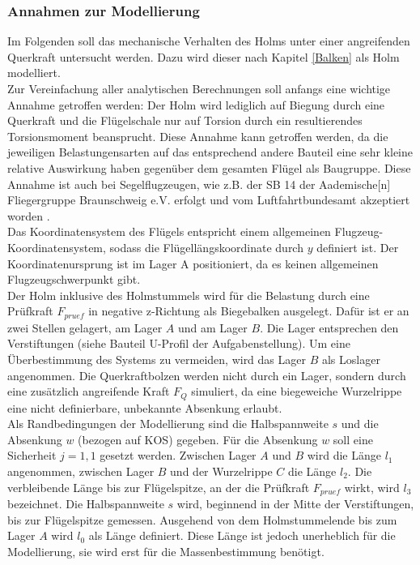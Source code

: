 \subsubsection{Annahmen zur Modellierung}
Im Folgenden soll das mechanische Verhalten des Holms unter einer angreifenden Querkraft untersucht werden. Dazu wird dieser nach Kapitel  \ref{Balken} als Holm modelliert.\\

\noindent Zur Vereinfachung aller analytischen Berechnungen soll anfangs eine wichtige Annahme getroffen werden: Der Holm wird lediglich auf Biegung durch eine Querkraft und die Flügelschale nur auf Torsion durch ein resultierendes Torsionsmoment beansprucht. Diese Annahme kann getroffen werden, da die jeweiligen Belastungensarten auf das entsprechend andere Bauteil eine sehr kleine relative Auswirkung haben gegenüber dem gesamten Flügel als Baugruppe. Diese Annahme ist auch bei Segelflugzeugen, wie z.B. der SB 14 der \glqq Aademische[n] Fliegergruppe Braunschweig e.V.\grqq\: erfolgt und vom Luftfahrtbundesamt akzeptiert worden \cite{item21}.\\

\noindent Das Koordinatensystem des Flügels entspricht einem allgemeinen Flugzeug-Koordinatensystem, sodass die Flügellängskoordinate durch $y$ definiert ist. Der Koordinatenursprung ist im Lager A positioniert, da es keinen allgemeinen Flugzeugschwerpunkt gibt. \\

\noindent Der Holm inklusive des Holmstummels wird für die Belastung durch eine Prüfkraft $F_{pruef}$ in negative z-Richtung als Biegebalken ausgelegt. Dafür ist er an zwei Stellen gelagert, am Lager $A$ und am Lager $B$. Die Lager entsprechen den Verstiftungen (siehe Bauteil U-Profil der Aufgabenstellung). Um eine Überbestimmung des Systems zu vermeiden, wird das Lager $B$ als Loslager angenommen. Die Querkraftbolzen werden nicht durch ein Lager, sondern durch eine zusätzlich angreifende Kraft $F_{Q}$ simuliert, da eine biegeweiche Wurzelrippe eine nicht definierbare, unbekannte Absenkung erlaubt.\\

\noindent Als Randbedingungen der Modellierung sind die Halbspannweite $s$ und die Absenkung $w$ (bezogen auf KOS) gegeben. Für die Absenkung $w$ soll eine Sicherheit $j=1,1$ gesetzt werden. Zwischen Lager $A$ und $B$ wird die Länge $l_{1}$ angenommen, zwischen Lager $B$ und der Wurzelrippe $C$ die Länge $l_{2}$. Die verbleibende Länge bis zur Flügelspitze, an der die Prüfkraft $F_{pruef}$ wirkt, wird $l_{3}$ bezeichnet. Die Halbspannweite $s$ wird, beginnend in der Mitte der Verstiftungen, bis zur Flügelspitze gemessen. Ausgehend von dem Holmstummelende bis zum Lager $A$ wird $l_{0}$ als Länge definiert. Diese Länge ist jedoch unerheblich für die Modellierung, sie wird erst für die Massenbestimmung benötigt.\\

